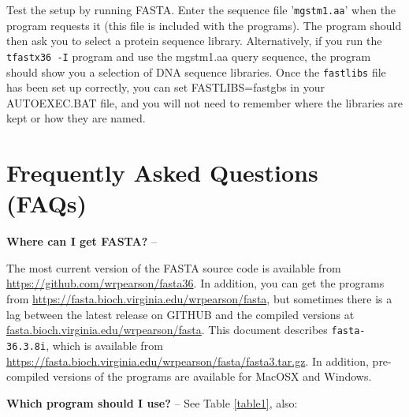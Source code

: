 \documentclass[11pt]{article}
\newcommand{\CURRENT}{fasta-36.3.8i}
\begin{document}
Test the setup by running FASTA.  Enter the sequence
file '\texttt{mgstm1.aa}' when the program requests it (this file is
included with the programs).  The program should then ask you to
select a protein sequence library.  Alternatively, if you run the
\texttt{tfastx36 -I} program and use the mgstm1.aa query sequence, the program
should show you a selection of DNA sequence libraries.
Once the \texttt{fastlibs} file has been set up correctly, you can
set FASTLIBS=fastgbs in your AUTOEXEC.BAT file, and you will not need to
remember where the libraries are kept or how they are named.

\section{Frequently Asked Questions (FAQs)}

{\noindent}\textbf{Where can I get FASTA?} --

The most current version of the FASTA source code is available from
\url{https://github.com/wrpearson/fasta36}.  In addition, you can get
the programs from \url{https://fasta.bioch.virginia.edu/wrpearson/fasta},
but sometimes there is a lag between the latest release on GITHUB and
the compiled versions at \url{fasta.bioch.virginia.edu/wrpearson/fasta}.  This document
describes \texttt{\CURRENT}, which is available from
\url{https://fasta.bioch.virginia.edu/wrpearson/fasta/fasta3.tar.gz}.  In
addition, pre-compiled versions of the programs are available for
MacOSX and Windows.

{\noindent}\textbf{Which program should I use?} -- See Table \ref{table1}, also:\\
\end{document}
